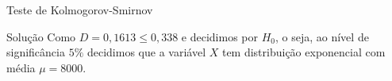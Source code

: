 \documentclass[10pt]{beamer}
\begin{document}
\begin{frame}{Teste de Kolmogorov-Smirnov}
\begin{block}{Solução}
Como $D = 0,1613 \leq 0,338$ e decidimos por $H_0$, o seja, ao nível de significância $5\%$ decidimos que a variável $X$ tem distribuição exponencial com média $\mu=8000$.
\end{block}

\normalsize
\end{frame}

%
%
%	
\end{document}
